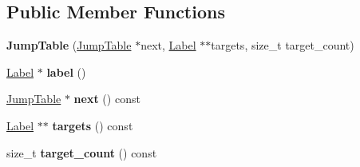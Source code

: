 \subsection*{Public Member Functions}
\begin{DoxyCompactItemize}
\item 
{\bfseries Jump\+Table} (\hyperlink{classv8_1_1internal_1_1compiler_1_1_code_generator_1_1_jump_table}{Jump\+Table} $\ast$next, \hyperlink{classv8_1_1internal_1_1_label}{Label} $\ast$$\ast$targets, size\+\_\+t target\+\_\+count)\hypertarget{classv8_1_1internal_1_1compiler_1_1_code_generator_1_1_jump_table_a0ede21dd9ee3589d4913b499fe823d52}{}\label{classv8_1_1internal_1_1compiler_1_1_code_generator_1_1_jump_table_a0ede21dd9ee3589d4913b499fe823d52}

\item 
\hyperlink{classv8_1_1internal_1_1_label}{Label} $\ast$ {\bfseries label} ()\hypertarget{classv8_1_1internal_1_1compiler_1_1_code_generator_1_1_jump_table_aa0954aa55cf8ed4efaf0931b730c0d1d}{}\label{classv8_1_1internal_1_1compiler_1_1_code_generator_1_1_jump_table_aa0954aa55cf8ed4efaf0931b730c0d1d}

\item 
\hyperlink{classv8_1_1internal_1_1compiler_1_1_code_generator_1_1_jump_table}{Jump\+Table} $\ast$ {\bfseries next} () const \hypertarget{classv8_1_1internal_1_1compiler_1_1_code_generator_1_1_jump_table_afe9be5d2338d89ffa77e8176d14e1f69}{}\label{classv8_1_1internal_1_1compiler_1_1_code_generator_1_1_jump_table_afe9be5d2338d89ffa77e8176d14e1f69}

\item 
\hyperlink{classv8_1_1internal_1_1_label}{Label} $\ast$$\ast$ {\bfseries targets} () const \hypertarget{classv8_1_1internal_1_1compiler_1_1_code_generator_1_1_jump_table_a464f813ac8428ea87818dfbbac9a0832}{}\label{classv8_1_1internal_1_1compiler_1_1_code_generator_1_1_jump_table_a464f813ac8428ea87818dfbbac9a0832}

\item 
size\+\_\+t {\bfseries target\+\_\+count} () const \hypertarget{classv8_1_1internal_1_1compiler_1_1_code_generator_1_1_jump_table_a2c305305e6f3f9bcdba2d56ee68f2fa9}{}\label{classv8_1_1internal_1_1compiler_1_1_code_generator_1_1_jump_table_a2c305305e6f3f9bcdba2d56ee68f2fa9}

\end{DoxyCompactItemize}
